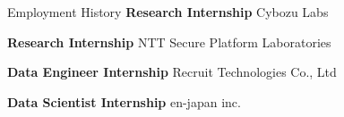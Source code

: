 \begin{rubric}{Employment History}
\entry*[2020 -- 2021]%
	\textbf{Research Internship} Cybozu Labs

%
%
%
	\textbf{Research Internship} NTT Secure Platform Laboratories
%
%

\entry*[2019 -- 2020]%
	\textbf{Data Engineer Internship} Recruit Technologies Co., Ltd

%
%
\entry*[2018 -- 2019]%
	\textbf{Data Scientist Internship} en-japan inc.
%
\end{rubric}
